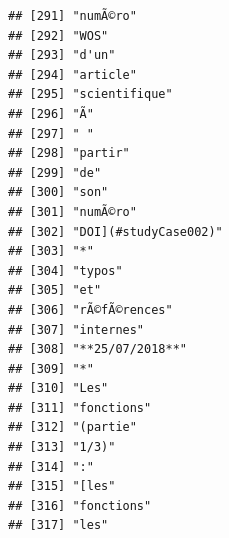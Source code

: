 \documentclass[]{book}
\begin{document}
\begin{verbatim}
## [291] "numÃ©ro"                                                                                
## [292] "WOS"                                                                                    
## [293] "d'un"                                                                                   
## [294] "article"                                                                                
## [295] "scientifique"                                                                           
## [296] "Ã"                                                                                      
## [297] " "                                                                                      
## [298] "partir"                                                                                 
## [299] "de"                                                                                     
## [300] "son"                                                                                    
## [301] "numÃ©ro"                                                                                
## [302] "DOI](#studyCase002)"                                                                    
## [303] "*"                                                                                      
## [304] "typos"                                                                                  
## [305] "et"                                                                                     
## [306] "rÃ©fÃ©rences"                                                                           
## [307] "internes"                                                                               
## [308] "**25/07/2018**"                                                                         
## [309] "*"                                                                                      
## [310] "Les"                                                                                    
## [311] "fonctions"                                                                              
## [312] "(partie"                                                                                
## [313] "1/3)"                                                                                   
## [314] ":"                                                                                      
## [315] "[les"                                                                                   
## [316] "fonctions"                                                                              
## [317] "les"                                                                                    

\end{verbatim}
\end{document}
